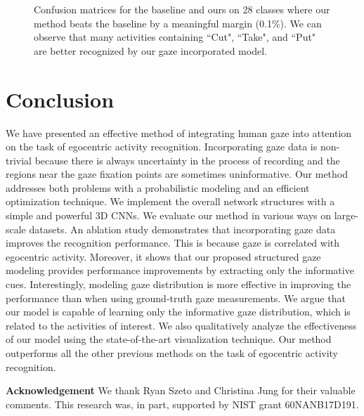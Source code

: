 \documentclass[10pt,twocolumn,letterpaper]{article}
\begin{document}
\begin{figure*}[htbp]
\centering
\hspace{-6pt}
  \adjustbox{valign=t}{\begin{minipage}[t]{0.45\linewidth}
  \small
    \texttt{[image: cropped\_top28\_baseline.png]}\-0.5ex] \hspace*{14.5em}(b) Ours
  \end{minipage}}
  \caption{Confusion matrices for the baseline and ours on 28 classes where our method beats the baseline by a meaningful margin (0.1\%). We can observe that many activities containing ``Cut", ``Take", and ``Put" are better recognized by our gaze incorporated model.}
  \label{fig:conf2}
\end{figure*}

\section{Conclusion} \label{sec:con}
We have presented an effective method of integrating human gaze into attention on the task of egocentric activity recognition. Incorporating gaze data is non-trivial because there is always uncertainty in the process of recording and the regions near the gaze fixation points are sometimes uninformative. Our method addresses both problems with a probabilistic modeling and an efficient optimization technique. We implement the overall network structures with a simple and powerful 3D CNNs. We evaluate our method in various ways on large-scale datasets. An ablation study demonstrates that incorporating gaze data improves the recognition performance. This is because gaze is correlated with egocentric activity. Moreover, it shows that our proposed structured gaze modeling provides performance improvements by extracting only the informative cues. Interestingly, modeling gaze distribution is more effective in improving the performance than when using ground-truth gaze measurements. We argue that our model is capable of learning only the informative gaze distribution, which is related to the activities of interest. We also qualitatively analyze the effectiveness of our model using the state-of-the-art visualization technique. Our method outperforms all the other previous methods on the task of egocentric activity recognition.



\noindent \textbf{Acknowledgement }
We thank Ryan Szeto and Christina Jung for their valuable comments. This research was, in part, supported by NIST grant 60NANB17D191.






{\small


}
\end{document}
